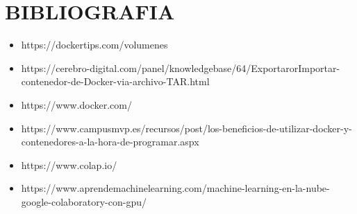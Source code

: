\section{BIBLIOGRAFIA} 

\begin{itemize}
\item https://dockertips.com/volumenes
\item https://cerebro-digital.com/panel/knowledgebase/64/ExportarorImportar-contenedor-de-Docker-via-archivo-TAR.html
\item  https://www.docker.com/
\item https://www.campusmvp.es/recursos/post/los-beneficios-de-utilizar-docker-y-contenedores-a-la-hora-de-programar.aspx
\item https://www.colap.io/
\item  https://www.aprendemachinelearning.com/machine-learning-en-la-nube-google-colaboratory-con-gpu/

\end{itemize}